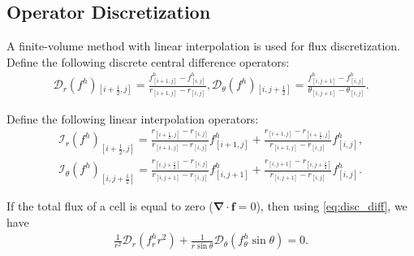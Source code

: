 \documentclass[preprint,10pt]{elsarticle}
\newcommand{\pars}[1]{\left(#1\right)}
\newcommand{\half}{\frac{1}{2}}
\newcommand\bnabla{\boldsymbol{\nabla}}
\newcommand\cI{\mathcal{I}}
\newcommand\cD{\mathcal{D}}
\begin{document}
\subsection{Operator Discretization} 
A finite-volume method with linear interpolation is used for flux discretization. 
Define the following discrete central difference operators:
\begin{align} \label{eq:disc_diff}
\cD_r(f^h){}_{\left[i+\half,j\right]} = \frac{f^h_{\left[i+1,j\right]} - f^h_{\left[i,j\right]}}
                       {r_{\left[i+1,j\right]} - r_{\left[i,j\right]}}, 
\cD_\theta(f^h){}_{\left[i,j+\half\right]} = \frac{f^h_{\left[i,j+1\right]} - f^h_{\left[i,j\right]}}
					   {\theta_{\left[i,j+1\right]} - \theta_{\left[i,j\right]}}.
\end{align}

Define the following linear interpolation operators:
\begin{align} \label{eq:disc_interp}
\cI_r(f^h)_{\left[i+\half,j\right]} = 
\frac{r_{\left[i+\half,j\right]} - r_{\left[i,j\right]}}
{r_{\left[i+1,j\right]} - r_{\left[i,j\right]}} 
f^h_{\left[i+1,j\right]} 
+ 
\frac{r_{\left[i+1,j\right]} - r_{\left[i+\half,j\right]}}
{r_{\left[i+1,j\right]} - r_{\left[i,j\right]}}
f^h_{\left[i,j\right]},
\\
\cI_\theta(f^h)_{\left[i,j+\half\right]} =
\frac{r_{\left[i,j+\half\right]} - r_{\left[i,j\right]}}
{r_{\left[i,j+1\right]} - r_{\left[i,j\right]}}
  f^h_{\left[i,j+1\right]} + 
\frac{ r_{\left[i,j+1\right]} - r_{\left[i,j+\half\right]}}
{r_{\left[i,j+1\right]} - r_{\left[i,j\right]}}
  f^h_{\left[i,j\right]}.
\end{align}

If the total flux of a cell is equal to zero ($\bnabla \cdot \boldsymbol{f} = 0$), 
then using \eqref{eq:disc_diff}, we have
\begin{eqnarray}
\frac{1}{r^2} \cD_r\pars{f^h_r r^2} + 
\frac{1}{r \sin\theta} \cD_\theta\pars{f^h_\theta \sin\theta} = 0. 
\end{eqnarray}
\end{document}
